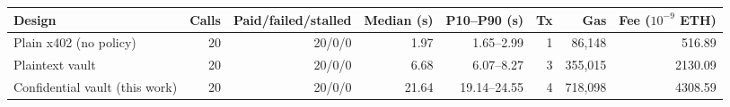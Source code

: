 \begin{tabular}{@{}lrrrrrrr@{}}
\toprule
Design & Calls & Paid/failed/stalled & Median (s) & P10--P90 (s) & Tx & Gas & Fee ($10^{-9}$ ETH) \\
\midrule
Plain x402 (no policy) & 20 & 20/0/0 & 1.97 & 1.65--2.99 & 1 & 86{,}148 & 516.89 \\
Plaintext vault & 20 & 20/0/0 & 6.68 & 6.07--8.27 & 3 & 355{,}015 & 2130.09 \\
Confidential vault (this work) & 20 & 20/0/0 & 21.64 & 19.14--24.55 & 4 & 718{,}098 & 4308.59 \\
\bottomrule
\end{tabular}
